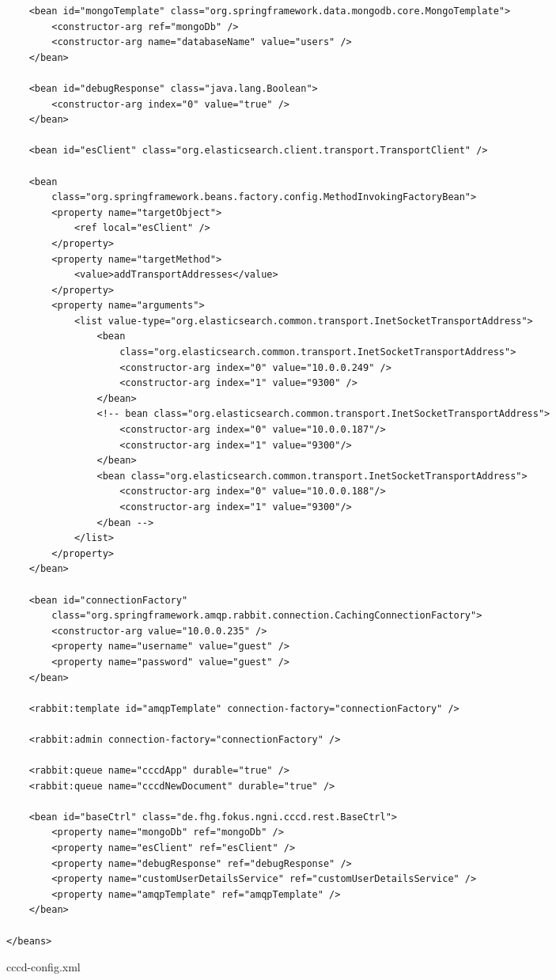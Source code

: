 \begin{appendix}
\begin{code}
\begin{verbatim}
	<bean id="mongoTemplate" class="org.springframework.data.mongodb.core.MongoTemplate">
		<constructor-arg ref="mongoDb" />
		<constructor-arg name="databaseName" value="users" />
	</bean>

	<bean id="debugResponse" class="java.lang.Boolean">
		<constructor-arg index="0" value="true" />
	</bean>

	<bean id="esClient" class="org.elasticsearch.client.transport.TransportClient" />

	<bean
		class="org.springframework.beans.factory.config.MethodInvokingFactoryBean">
		<property name="targetObject">
			<ref local="esClient" />
		</property>
		<property name="targetMethod">
			<value>addTransportAddresses</value>
		</property>
		<property name="arguments">
			<list value-type="org.elasticsearch.common.transport.InetSocketTransportAddress">
				<bean
					class="org.elasticsearch.common.transport.InetSocketTransportAddress">
					<constructor-arg index="0" value="10.0.0.249" />
					<constructor-arg index="1" value="9300" />
				</bean>
				<!-- bean class="org.elasticsearch.common.transport.InetSocketTransportAddress"> 
					<constructor-arg index="0" value="10.0.0.187"/>
					<constructor-arg index="1" value="9300"/> 
				</bean> 
				<bean class="org.elasticsearch.common.transport.InetSocketTransportAddress"> 
					<constructor-arg index="0" value="10.0.0.188"/> 
					<constructor-arg index="1" value="9300"/> 
				</bean -->
			</list>
		</property>
	</bean>

	<bean id="connectionFactory"
		class="org.springframework.amqp.rabbit.connection.CachingConnectionFactory">
		<constructor-arg value="10.0.0.235" />
		<property name="username" value="guest" />
		<property name="password" value="guest" />
	</bean>

	<rabbit:template id="amqpTemplate" connection-factory="connectionFactory" />

	<rabbit:admin connection-factory="connectionFactory" />

	<rabbit:queue name="cccdApp" durable="true" />
	<rabbit:queue name="cccdNewDocument" durable="true" />

	<bean id="baseCtrl" class="de.fhg.fokus.ngni.cccd.rest.BaseCtrl">
		<property name="mongoDb" ref="mongoDb" />
		<property name="esClient" ref="esClient" />
		<property name="debugResponse" ref="debugResponse" />
		<property name="customUserDetailsService" ref="customUserDetailsService" />
		<property name="amqpTemplate" ref="amqpTemplate" />
	</bean>

</beans>
\end{verbatim}
\caption{cccd-config.xml}
\label{lst:cccd-config.xml}
\end{code}

\end{appendix}

\endinput
